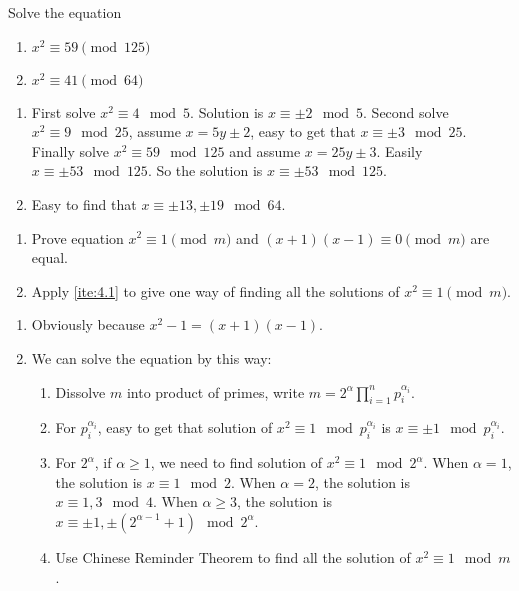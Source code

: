 \documentclass{ctexart}
\begin{document}
\begin{problem}\label{pro:3}
  Solve the equation
  \begin{enumerate}
    \item\( x^2  \equiv 59 \pmod{125} \)
    \item \(    x^2  \equiv 41 \pmod{64}\)
  \end{enumerate}
\end{problem}
\begin{solution}
  \begin{enumerate}
    \item First solve \(x^2 \equiv 4 \mod 5\). Solution is \(x \equiv \pm 2 \mod 5\).
      Second solve \(x^2 \equiv 9 \mod 25\), assume \(x=5y \pm 2\), easy to get that \(x \equiv \pm 3 \mod 25\).
      Finally solve \(x^2 \equiv 59 \mod 125\) and assume \(x = 25y \pm 3\). Easily \(x \equiv \pm 53 \mod 125\).
      So the solution is \(x \equiv \pm 53 \mod 125\).
    \item Easy to find that \(x \equiv \pm 13,\pm 19 \mod 64\).
  \end{enumerate}
\end{solution}

\begin{problem}\label{pro:4}
  \begin{enumerate}
    \item \label{ite:4.1} Prove equation \(x^2 \equiv 1 \pmod{m}\) and \((x + 1)(x-1) \equiv 0 \pmod{m}\) are equal.
    \item Apply \ref{ite:4.1} to give one way of finding all the solutions of \(x^2 \equiv 1 \pmod{m}\).
  \end{enumerate}
\end{problem}
\begin{solution}
  \begin{enumerate}
    \item Obviously because \(x^2-1=(x+1)(x-1)\).
    \item We can solve the equation by this way:
      \begin{enumerate}
        \item Dissolve \(m\) into product of primes, write \(m=2^{\alpha}\prod_{i=1}^{n} p_i^{\alpha_i}\).
        \item For \(p_i^{\alpha_i}\), easy to get that solution of \(x^2 \equiv 1 \mod p_i^{\alpha_i}\) is \(x \equiv \pm 1 \mod p_i^{\alpha_i}\).
        \item For \(2^\alpha\), if \(\alpha \geq 1\), we need to find solution of \(x^2 \equiv 1 \mod 2^\alpha\).
          When \(\alpha=1\), the solution is \(x \equiv 1 \mod 2\).
          When \(\alpha=2\), the solution is \(x \equiv 1,3 \mod 4\).
          When \(\alpha \geq 3\), the solution is \(x \equiv \pm 1,\pm (2^{\alpha-1}+1) \mod 2^\alpha\).
        \item Use Chinese Reminder Theorem to find all the solution of \(x^2 \equiv 1 \mod m\).
      \end{enumerate}
  \end{enumerate}
\end{solution}
\end{document}
